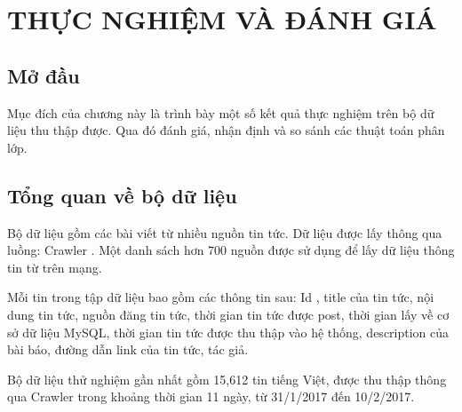 \chapter{THỰC NGHIỆM VÀ ĐÁNH GIÁ}
\ifpdf
    \graphicspath{{Chapter4/Chapter4Figs/PNG/}{Chapter4/Chapter4Figs/PDF/}{Chapter4/Chapter4Figs/}}
\else
    \graphicspath{{Chapter4/Chapter4Figs/EPS/}{Chapter4/Chapter4Figs/}}
\fi

\section{Mở đầu}
Mục đích của chương này là trình bày một số kết quả thực nghiệm trên bộ dữ liệu thu thập được. Qua đó đánh giá, nhận định và so sánh các thuật toán phân lớp.

\section{Tổng quan về bộ dữ liệu}
Bộ dữ liệu gồm các bài viết từ nhiều nguồn tin tức. Dữ liệu được lấy thông qua luồng: Crawler . Một danh sách hơn 700 nguồn được sử dụng để lấy dữ liệu thông tin từ trên mạng.

Mỗi tin trong tập dữ liệu bao gồm các thông tin sau: Id , title của tin tức, nội dung tin tức, nguồn đăng tin tức, thời gian tin tức được post, thời gian lấy về cơ sở dữ liệu MySQL, thời gian tin tức được thu thập vào hệ thống, description của bài báo, đường dẫn link của tin tức, tác giả.

Bộ dữ liệu thử nghiệm gần nhất gồm 15,612 tin tiếng Việt, được thu thập thông qua Crawler trong khoảng thời gian 11 ngày, từ 31/1/2017 đến 10/2/2017.

